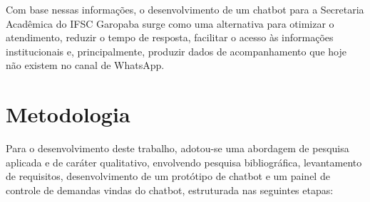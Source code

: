 \documentclass[12pt]{article}
\begin{document}
Com base nessas informações, o desenvolvimento de um chatbot para a
Secretaria Acadêmica do IFSC Garopaba surge como uma alternativa para
otimizar o atendimento, reduzir o tempo de resposta, facilitar o acesso
às informações institucionais e, principalmente, produzir dados de
acompanhamento que hoje não existem no canal de WhatsApp.

\section{Metodologia}\label{sec:metodologia}

Para o desenvolvimento deste trabalho, adotou-se uma abordagem de
pesquisa aplicada e de caráter qualitativo, envolvendo pesquisa
bibliográfica, levantamento de requisitos, desenvolvimento de um
protótipo de chatbot e um painel de controle de demandas vindas do chatbot, estruturada nas seguintes etapas:
\end{document}
